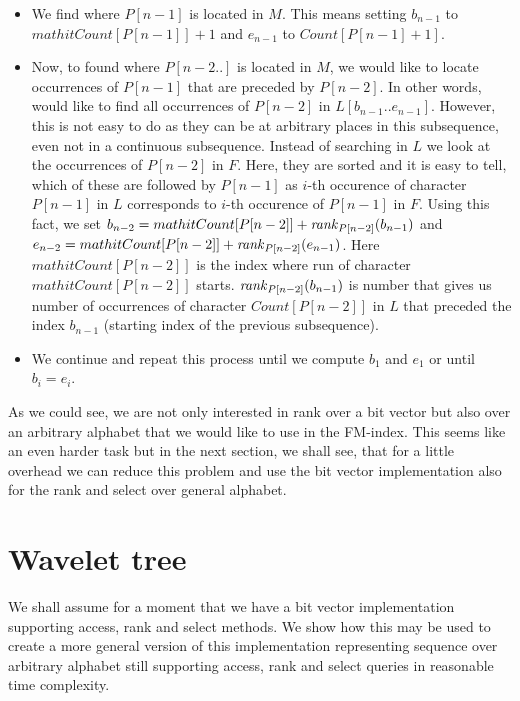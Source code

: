 \begin{itemize}
	\item We find where $P[n-1]$ is located in $M$. This means setting $b_{n-1}$ to
	$mathit{Count}[P[n-1]]+1$ and $e_{n-1}$ to $\mathit{Count}[P[n-1]+1]$.
	\item Now, to found where $P[n-2..]$ is located in $M$, we would like to locate occurrences
	of $P[n-1]$ that are preceded by $P[n-2]$. In other words, would like to find all
	occurrences of $P[n-2]$ in $L[b_{n-1}..e_{n-1}]$. However, this is not easy to do
	as they can be at arbitrary places in this subsequence, even not in a continuous
	subsequence. Instead of searching in $L$ we look at the occurrences of $P[n-2]$ in
	$F$. Here, they are sorted and it is easy to tell, which of these are followed by
	$P[n-1]$ as $i$-th occurence of character $P[n-1]$ in $L$ corresponds to $i$-th
	occurence of $P[n-1]$ in $F$. Using this fact, we set
	$b_{n-2} = mathit{Count}[P[n-2]] + \mathit{rank}_{P[n-2]}(b_{n-1})$ and
	$e_{n-2} = mathit{Count}[P[n-2]] + \mathit{rank}_{P[n-2]}(e_{n-1})$. Here $mathit{Count}[P[n-2]]$
	is the index where run of character $mathit{Count}[P[n-2]]$ starts. $\mathit{rank}_{P[n-2]}(b_{n-1})$
	is number that gives us number of occurrences of character $Count[P[n-2]]$ in $L$ that
	preceded the index $b_{n-1}$ (starting index of the previous subsequence).
	\item We continue and repeat this process until we compute $b_1$ and $e_1$ or until
	$b_i=e_i$.
\end{itemize}

As we could see, we are not only interested in rank over a bit vector but also over an arbitrary
alphabet that we would like to use in the FM-index. This seems like an even harder task but in
the next section, we shall see, that for a little overhead we can reduce this problem and use
the bit vector implementation also for the rank and select over general alphabet.

\section{Wavelet tree}
\label{section:WaweletTree}

We shall assume for a moment that we have a bit vector implementation supporting
access, rank and select methods. We show how this may be used to create
a more general version of this implementation representing sequence over arbitrary
alphabet still supporting access, rank and select queries in reasonable time complexity.

